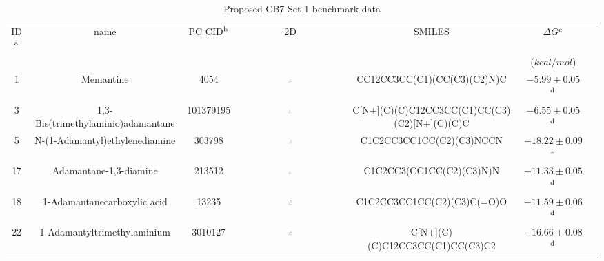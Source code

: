 \documentclass[aps,pre,twocolumn,nofootinbib,superscriptaddress,10pt, final,tightenlines]{revtex4-1}
\begin{document}
\begingroup
\squeezetable
\begin{table}
\caption{Proposed CB7 Set 1 benchmark data}
\label{cb7_benchmark1}
\begin{tabular}{@{}| c | c | c | c | c | c | c@{}}
\hline
ID$^{\rm a}$ & name & PC CID$^{\rm b}$ &  2D      & SMILES &  $\Delta G$$^{\rm c}$ \\\
               &           &                   &               &        & ($kcal/mol$)                \\\hline

1 &	\tiny{Memantine}	& 4054 & \includegraphics[width=0.04\textwidth]{figures/4054.pdf} &	\tiny{CC12CC3CC(C1)(CC(C3)(C2)N)C} & $-5.99 \pm 0.05$ $^{\rm d}$ \\
3 &	\tiny{1,3-Bis(trimethylaminio)adamantane}	& 101379195 & \includegraphics[width=0.04\textwidth]{figures/101379195.pdf}	& \tiny{C[N+](C)(C)C12CC3CC(C1)CC(C3)(C2)[N+](C)(C)C} & $-6.55 \pm 0.05$   $^{\rm d}$ \\
5 &	\tiny{N-(1-Adamantyl)ethylenediamine} &	303798 & \includegraphics[width=0.04\textwidth]{figures/303798.pdf} &	\tiny{C1C2CC3CC1CC(C2)(C3)NCCN} & $-18.22 \pm 0.09 $  $^{\rm e}$ \\
17 &	\tiny{Adamantane-1,3-diamine} &	213512 & \includegraphics[width=0.04\textwidth]{figures/213512.pdf} & 	\tiny{C1C2CC3(CC1CC(C2)(C3)N)N} & $-11.33 \pm 0.05 $   $^{\rm d}$ \\
18 &	\tiny{1-Adamantanecarboxylic acid} &	13235 &	\includegraphics[width=0.04\textwidth]{figures/13235.pdf} & \tiny{C1C2CC3CC1CC(C2)(C3)C(=O)O} & $-11.59 \pm 0.06$  $^{\rm d}$ \\
22 &	\tiny{1-Adamantyltrimethylaminium} &	3010127	& \includegraphics[width=0.04\textwidth]{figures/3010127.pdf} & \tiny{C[N+](C)(C)C12CC3CC(C1)CC(C3)C2} & $-16.66 \pm 0.08$  $^{\rm d}$ \\

\end{tabular}
\end{table}
\end{document}
